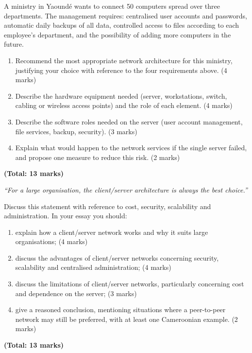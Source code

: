 \documentclass[11pt]{article}
\begin{document}
\begin{exercice}
A ministry in Yaoundé wants to connect 50 computers spread over three departments. The management requires: centralised user accounts and passwords, automatic daily backups of all data, controlled access to files according to each employee's department, and the possibility of adding more computers in the future.
\begin{enumerate}
\item Recommend the most appropriate network architecture for this ministry, justifying your choice with reference to the four requirements above. \hfill (4 marks)
\item Describe the hardware equipment needed (server, workstations, switch, cabling or wireless access points) and the role of each element. \hfill (4 marks)
\item Describe the software roles needed on the server (user account management, file services, backup, security). \hfill (3 marks)
\item Explain what would happen to the network services if the single server failed, and propose one measure to reduce this risk. \hfill (2 marks)
\end{enumerate}
\hfill \textbf{(Total: 13 marks)}
\end{exercice}

\begin{exercice}
\emph{``For a large organisation, the client/server architecture is always the best choice.''}

Discuss this statement with reference to cost, security, scalability and administration. In your essay you should:
\begin{enumerate}
\item explain how a client/server network works and why it suits large organisations; \hfill (4 marks)
\item discuss the advantages of client/server networks concerning security, scalability and centralised administration; \hfill (4 marks)
\item discuss the limitations of client/server networks, particularly concerning cost and dependence on the server; \hfill (3 marks)
\item give a reasoned conclusion, mentioning situations where a peer-to-peer network may still be preferred, with at least one Cameroonian example. \hfill (2 marks)
\end{enumerate}
\hfill \textbf{(Total: 13 marks)}
\end{exercice}
\end{document}
